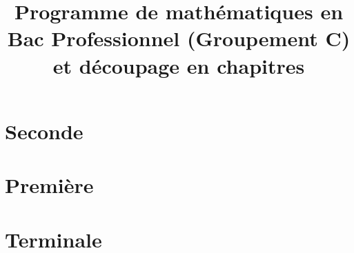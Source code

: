 \documentclass[12pt,a4paper]{article}
\author{}
\date{}
\title{Programme de mathématiques en Bac Professionnel (Groupement C) et découpage en chapitres}
\begin{document}
\maketitle

\section{Seconde}

\twoCol{}

\newpage
\section{Première}

\twoCol{}
\newpage
\section{Terminale}

\twoCol{}
\end{document}

